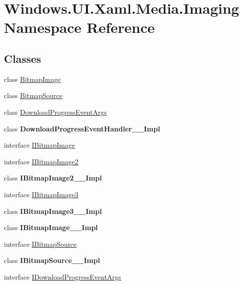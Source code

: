 \hypertarget{namespace_windows_1_1_u_i_1_1_xaml_1_1_media_1_1_imaging}{}\section{Windows.\+U\+I.\+Xaml.\+Media.\+Imaging Namespace Reference}
\label{namespace_windows_1_1_u_i_1_1_xaml_1_1_media_1_1_imaging}
\subsection*{Classes}
\begin{DoxyCompactItemize}
\item 
class \hyperlink{class_windows_1_1_u_i_1_1_xaml_1_1_media_1_1_imaging_1_1_bitmap_image}{Bitmap\+Image}
\item 
class \hyperlink{class_windows_1_1_u_i_1_1_xaml_1_1_media_1_1_imaging_1_1_bitmap_source}{Bitmap\+Source}
\item 
class \hyperlink{class_windows_1_1_u_i_1_1_xaml_1_1_media_1_1_imaging_1_1_download_progress_event_args}{Download\+Progress\+Event\+Args}
\item 
class {\bfseries Download\+Progress\+Event\+Handler\+\_\+\+\_\+\+Impl}
\item 
interface \hyperlink{interface_windows_1_1_u_i_1_1_xaml_1_1_media_1_1_imaging_1_1_i_bitmap_image}{I\+Bitmap\+Image}
\item 
interface \hyperlink{interface_windows_1_1_u_i_1_1_xaml_1_1_media_1_1_imaging_1_1_i_bitmap_image2}{I\+Bitmap\+Image2}
\item 
class {\bfseries I\+Bitmap\+Image2\+\_\+\+\_\+\+Impl}
\item 
interface \hyperlink{interface_windows_1_1_u_i_1_1_xaml_1_1_media_1_1_imaging_1_1_i_bitmap_image3}{I\+Bitmap\+Image3}
\item 
class {\bfseries I\+Bitmap\+Image3\+\_\+\+\_\+\+Impl}
\item 
class {\bfseries I\+Bitmap\+Image\+\_\+\+\_\+\+Impl}
\item 
interface \hyperlink{interface_windows_1_1_u_i_1_1_xaml_1_1_media_1_1_imaging_1_1_i_bitmap_source}{I\+Bitmap\+Source}
\item 
class {\bfseries I\+Bitmap\+Source\+\_\+\+\_\+\+Impl}
\item 
interface \hyperlink{interface_windows_1_1_u_i_1_1_xaml_1_1_media_1_1_imaging_1_1_i_download_progress_event_args}{I\+Download\+Progress\+Event\+Args}
\item 

\end{DoxyCompactItemize}
